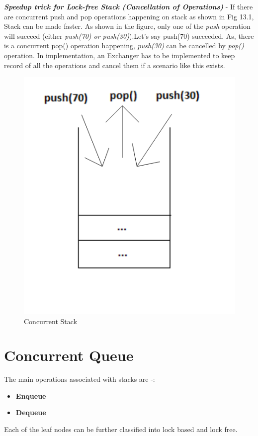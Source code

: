 \documentclass[twoside]{article}
\begin{document}
\textbf{\textit{Speedup trick for Lock-free Stack (Cancellation of Operations)}} - If there are concurrent push and pop operations happening on stack as shown in Fig 13.1, Stack can be made faster. As shown in the figure, only one of the \textit{push} operation will succeed (either \textit{push(70) or push(30)}).Let's say push(70) succeeded. As, there is a concurrent pop() operation happening, \textit{push(30)} can be cancelled by \textit{pop()} operation. In implementation, an Exchanger has to be implemented to keep record of all the operations and cancel them if a scenario like this exists.
\begin{figure}[H]
\centering
\includegraphics[scale=0.5]{Stack}
\caption{Concurrent Stack}
\label{fig:2}
\end{figure}

\section{Concurrent Queue}
The main operations associated with stacks are -:
\begin{itemize}
    \item \textbf{Enqueue}
    \item \textbf{Dequeue}
\end{itemize}
\begin{center}
\end{center}
Each of the leaf nodes can be further classified into lock based and lock free.
\end{document}
